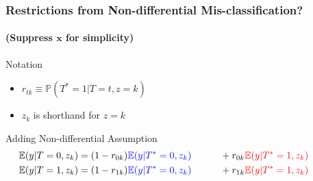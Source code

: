 \documentclass[handout]{beamer}
\begin{document}
\begin{frame}[t,noframenumbering]
  \frametitle{Restrictions from Non-differential Mis-classification?}
  \framesubtitle{(Suppress $\mathbf{x}$ for simplicity)}

  \footnotesize

  \begin{block}{Notation}
    \begin{itemize}
      \item $r_{tk} \equiv \mathbb{P}(T^*=1|T=t,z=k)$
      \item $z_k$ is shorthand for $z =k$\\
    \end{itemize}
  \end{block}
  
  \begin{block}{Adding Non-differential Assumption}
    \vspace{-1em}
  \begin{align*}
    \mathbb{E}(y|T=0,z_k) &= (1 - r_{0k})\textcolor{blue}{\mathbb{E}(y|T^*=0,z_k)}\phantom{,T=0} + r_{0k}\textcolor{red}{\mathbb{E}(y|T^*=1,z_k)}\phantom{,T=0}\\
    \mathbb{E}(y|T=1,z_k) &= (1 - r_{1k}) \textcolor{blue}{\mathbb{E}(y|T^*=0,z_k)}\phantom{,T=1} + r_{1k}\textcolor{red}{\mathbb{E}(y|T^*=1,z_k)}\phantom{,T=1}
  \end{align*}

  \vspace{1em}

  \end{block}

\end{frame}
\end{document}
